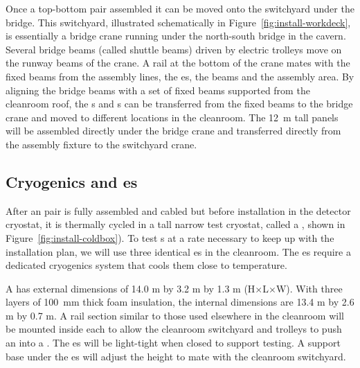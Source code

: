 Once a top-bottom  pair assembled it can be moved onto the switchyard under the bridge. 
This switchyard, illustrated schematically in Figure~\ref{fig:install-workdeck}, is essentially a bridge crane running under the north-south bridge in the cavern.  
Several bridge beams (called shuttle beams) driven by electric trolleys  move on the runway beams of the crane.  
A rail at the bottom of the crane mates with the fixed beams  from the assembly lines, the \coldbox{}es, the  beams and the  assembly area.
By aligning the bridge beams with a set of fixed beams supported from the cleanroom roof, the s and s can be transferred from the fixed beams to the bridge crane and moved to different locations in the cleanroom. 
The \SI{12}{m} tall  panels will be assembled directly under the bridge crane and transferred directly from the assembly fixture to the switchyard crane.

\subsection{Cryogenics and \Coldbox{}es}
\label{sec:fdsp-tc-infr-cryo}



After an  pair is fully assembled and cabled but before installation in the detector cryostat, it is thermally cycled in a tall narrow test cryostat, called a \coldbox{}, shown in Figure~\ref{fig:install-coldbox}). 
To test s at a rate necessary to keep up with the installation plan, we will use three identical \coldbox{}es in the cleanroom. 
The \coldbox{}es require a dedicated cryogenics system that cools them  close to  temperature. 


A \coldbox has external dimensions of 14.0 \si{m} by 3.2 \si{m} by 1.3 \si{m} (H$\times$L$\times$W). With three layers of \SI{100}{mm} thick foam insulation,  
the internal dimensions are 13.4 \si{m} by 2.6 \si{m} by 0.7 \si{m}. A rail section similar to those used elsewhere in the cleanroom will be mounted inside each \coldbox to allow the cleanroom switchyard and trolleys to push an    into a \coldbox. The \coldbox{}es will be light-tight when closed to support  testing. A support base under the \coldbox{}es will adjust the height to mate with the cleanroom switchyard.

